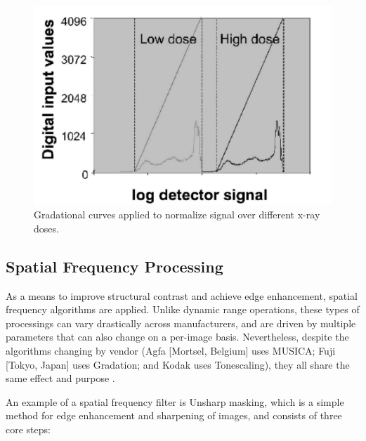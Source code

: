 \documentclass[nomenclature, english, bibtex]{kththesis}
\numberwithin{listing}{chapter}
\begin{document}
\begin{figure}[H]
    \centering
    \includegraphics[width=1.0\textwidth]{figures/LUT.png}
    \caption{Gradational curves applied to normalize signal over different x-ray doses\cite[Figure~3]{Prokop2003}.}
    \label{fig:histogram_stretching}
\end{figure}


\subsection{Spatial Frequency Processing}

As a means to improve structural contrast and achieve edge enhancement, spatial frequency algorithms are applied.
Unlike dynamic range operations, these types of processings can vary drastically across manufacturers, and
are driven by multiple parameters that can also change on a per-image basis. Nevertheless, despite the algorithms
changing by vendor (Agfa [Mortsel, Belgium] uses MUSICA; Fuji [Tokyo, Japan] uses Gradation; and Kodak uses Tonescaling),
they all share the same effect and purpose \cite[p.~119]{carterDigitalRadiographyPACS2010}.

An example of a spatial frequency filter is Unsharp masking, which is a simple method for edge enhancement and sharpening of images,
and consists of three core steps:
\end{document}
